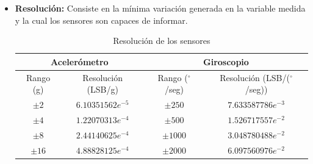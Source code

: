 \documentclass[12pt,a4paper]{article}
\newcommand{\grad}{$^{\circ}$}
\begin{document}
\begin{itemize}
	\item \textbf{Resolución:} Consiste en la mínima variación generada en la variable medida y la cual los sensores son capaces de informar.
	
	\begin{table}[H]
		\centering
		\label{table:resolucionSensor}
		\caption{Resolución de los sensores}
		\begin{tabular}{|c|c|c|c|}
			\hline
			\multicolumn{2}{|c|}{Acelerómetro} &\multicolumn{2}{|c|}{Giroscopio}   \\
			\hline
			Rango (g)        & Resolución (LSB/g)  & Rango (\grad/seg)     &  Resolución (LSB/(\grad/seg))\\ \hline
			$\pm 2$     &  $6.10351562e^{-5}$   &$\pm 250 $ 	& 	$7.633587786e^{-3}$ 	\\ 
			$\pm 4$     &  $1.22070313e^{-4}$  	&$\pm 500 $ 	& 	$1.526717557e^{-2}$    	\\
			$\pm 8$     &  $2.44140625e^{-4}$ 	& $\pm 1000$  	& 	$3.048780488e^{-2}$		\\
			$\pm 16$    &  $4.88828125e^{-4}$   & $\pm 2000$    & 	$6.097560976e^{-2}$     \\ 
			\hline
		\end{tabular}
	\end{table}
	
\end{itemize}
\end{document}
